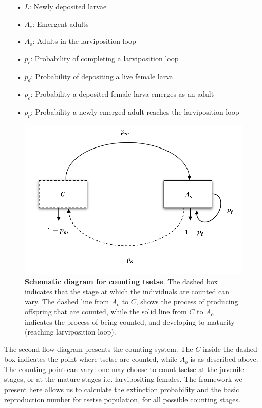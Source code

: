 \documentclass[smallextended]{svjour3}
\begin{document}
\begin{itemize}
	\item[•] $L$: Newly deposited larvae
	\item[•] $A_{e}$: Emergent adults
	\item[•] $A_{o}$: Adults in the larviposition loop
	\item[•] $p_{\ell}$: Probability of completing a larviposition loop 
	\item[•] $p_d$: Probability of depositing a live female larva 
	\item[•] $p_e$: Probability a deposited female larva emerges as an adult 
	\item[•] $p_{\nu}$: Probability a newly emerged adult reaches the larviposition loop 
\end{itemize}

\begin{figure}[hbt!]
	\centering
	\includegraphics[width=0.7\linewidth]{Compflowchart.png}
	\caption{\textbf{Schematic diagram for counting tsetse}. The dashed box indicates that the stage at which the individuals are counted can vary. The dashed line from $A_{o}$ to $C$, shows the process of producing offspring that are counted, while the solid line from $C$ to $A_{o}$ indicates the process of being counted, and developing to maturity (reaching larviposition loop).}
	\label{fig:compflowchart}
\end{figure}

The second flow diagram presents the counting system. The $C$ inside the dashed box indicates the point where tsetse are counted, while $A_{o}$ is as described above. The counting point can vary: one may choose to count tsetse at the juvenile stages, or at the mature stages i.e. larvipositing females. The framework we present here allows us to calculate the extinction probability and the basic reproduction number for tsetse population, for all possible counting stages. 
\end{document}
